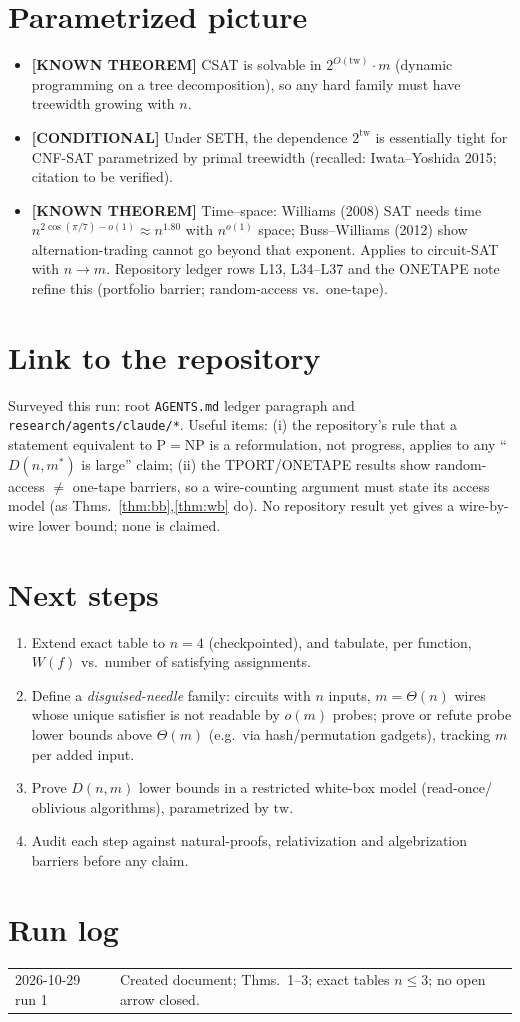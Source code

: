 \documentclass[11pt]{article}
\newcommand{\status}[1]{\textbf{[#1]}}
\begin{document}
\section{Parametrized picture}
\begin{itemize}
\item \status{KNOWN THEOREM} CSAT is solvable in $2^{O(\mathrm{tw})}\cdot m$ (dynamic programming on a tree decomposition), so any hard family must have treewidth growing with $n$.
\item \status{CONDITIONAL} Under SETH, the dependence $2^{\mathrm{tw}}$ is essentially tight for CNF-SAT parametrized by primal treewidth (recalled: Iwata--Yoshida 2015; citation to be verified).
\item \status{KNOWN THEOREM} Time--space: Williams (2008) SAT needs time $n^{2\cos(\pi/7)-o(1)}\approx n^{1.80}$ with $n^{o(1)}$ space; Buss--Williams (2012) show alternation-trading cannot go beyond that exponent. Applies to circuit-SAT with $n\to m$. Repository ledger rows L13, L34--L37 and the ONETAPE note refine this (portfolio barrier; random-access vs.\ one-tape).
\end{itemize}

\section{Link to the repository}
Surveyed this run: root \texttt{AGENTS.md} ledger paragraph and \texttt{research/agents/claude/*}. Useful items:
(i) the repository's rule that a statement equivalent to P$=$NP is a reformulation, not progress, applies
to any ``$D(n,m^*)$ is large'' claim; (ii) the TPORT/ONETAPE results show random-access $\ne$ one-tape
barriers, so a wire-counting argument must state its access model (as Thms.~\ref{thm:bb},\ref{thm:wb} do).
No repository result yet gives a wire-by-wire lower bound; none is claimed.

\section{Next steps}
\begin{enumerate}
\item Extend exact table to $n=4$ (checkpointed), and tabulate, per function, $W(f)$ vs.\ number of satisfying assignments.
\item Define a \emph{disguised-needle} family: circuits with $n$ inputs, $m=\Theta(n)$ wires whose unique satisfier is not readable by $o(m)$ probes; prove or refute probe lower bounds above $\Theta(m)$ (e.g.\ via hash/permutation gadgets), tracking $m$ per added input.
\item Prove $D(n,m)$ lower bounds in a restricted white-box model (read-once/ oblivious algorithms), parametrized by $\mathrm{tw}$.
\item Audit each step against natural-proofs, relativization and algebrization barriers before any claim.
\end{enumerate}

\section*{Run log}
\begin{tabular}{@{}ll@{}}
2026-10-29 run 1 & Created document; Thms.\ 1--3; exact tables $n\le3$; no open arrow closed. \\
\end{tabular}
\end{document}
